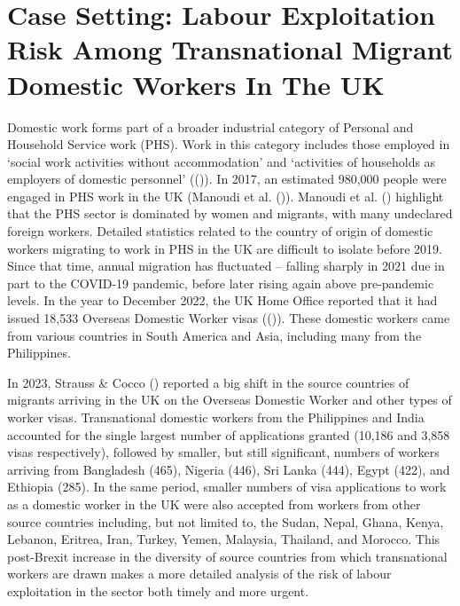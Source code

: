 \documentclass[
  12pt,
]{article}
\theoremstyle{plain}
\theoremstyle{definition}
\begin{document}
\section{Case Setting: Labour Exploitation Risk Among Transnational
Migrant Domestic Workers In The
UK}\label{case-setting-labour-exploitation-risk-among-transnational-migrant-domestic-workers-in-the-uk}

Domestic work forms part of a broader industrial category of Personal
and Household Service work (PHS). Work in this category includes those
employed in `social work activities without accommodation' and
`activities of households as employers of domestic personnel'
(()).
In 2017, an estimated 980,000 people were engaged in PHS work in the UK
(Manoudi et al. ()). Manoudi
et al. () highlight that the
PHS sector is dominated by women and migrants, with many undeclared
foreign workers. Detailed statistics related to the country of origin of
domestic workers migrating to work in PHS in the UK are difficult to
isolate before 2019. Since that time, annual migration has fluctuated --
falling sharply in 2021 due in part to the COVID-19 pandemic, before
later rising again above pre-pandemic levels. In the year to December
2022, the UK Home Office reported that it had issued 18,533 Overseas
Domestic Worker visas
(()). These
domestic workers came from various countries in South America and Asia,
including many from the Philippines.

In 2023, Strauss \& Cocco ()
reported a big shift in the source countries of migrants arriving in the
UK on the Overseas Domestic Worker and other types of worker visas.
Transnational domestic workers from the Philippines and India accounted
for the single largest number of applications granted (10,186 and 3,858
visas respectively), followed by smaller, but still significant, numbers
of workers arriving from Bangladesh (465), Nigeria (446), Sri Lanka
(444), Egypt (422), and Ethiopia (285). In the same period, smaller
numbers of visa applications to work as a domestic worker in the UK were
also accepted from workers from other source countries including, but
not limited to, the Sudan, Nepal, Ghana, Kenya, Lebanon, Eritrea, Iran,
Turkey, Yemen, Malaysia, Thailand, and Morocco. This post-Brexit
increase in the diversity of source countries from which transnational
workers are drawn makes a more detailed analysis of the risk of labour
exploitation in the sector both timely and more urgent.
\end{document}
